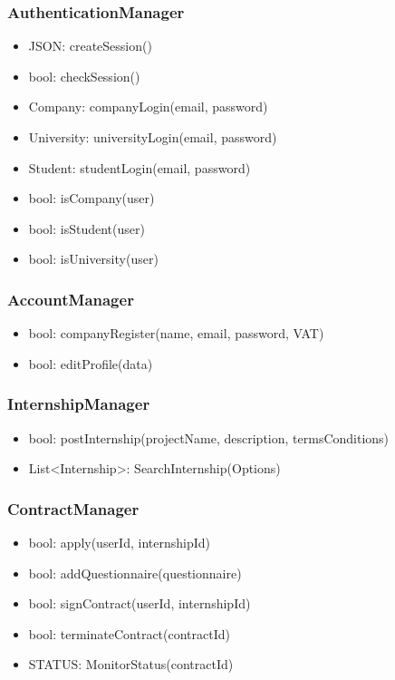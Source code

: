 \subsubsection{AuthenticationManager}
\begin{itemize}
    \item JSON: createSession()
    \item bool: checkSession()
    \item Company: companyLogin(email, password)
    \item University: universityLogin(email, password)
    \item Student: studentLogin(email, password)
    \item bool: isCompany(user)
    \item bool: isStudent(user)
    \item bool: isUniversity(user)
\end{itemize}
\subsubsection{AccountManager}
\begin{itemize}
    \item bool: companyRegister(name, email, password, VAT)
    \item bool: editProfile(data)
\end{itemize}
\subsubsection{InternshipManager}
\begin{itemize}
    \item bool: postInternship(projectName, description, termsConditions)
    \item List<Internship>: SearchInternship(Options)
\end{itemize}
\subsubsection{ContractManager}
\begin{itemize}
    \item bool: apply(userId, internshipId)
    \item bool: addQuestionnaire(questionnaire)
    \item bool: signContract(userId, internshipId)
    \item bool: terminateContract(contractId)
    \item STATUS: MonitorStatus(contractId)
\end{itemize}
